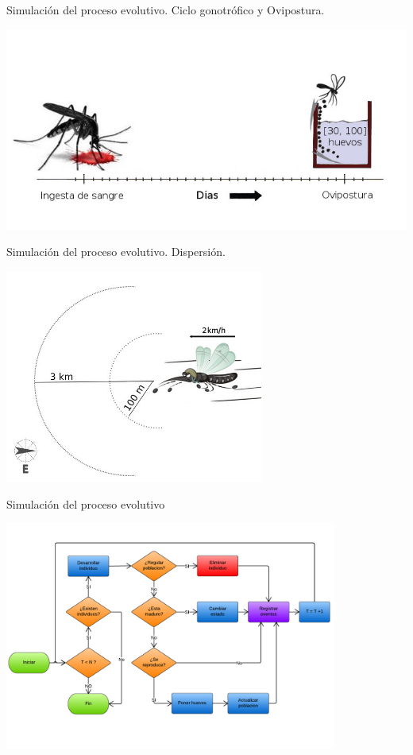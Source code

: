 \begin{frame}[c]{Simulación del proceso evolutivo. Ciclo gonotrófico y Ovipostura.}
  \begin{center}
      \includegraphics[width=\textwidth]{./graphics/cliclo-gonotrofico-tiempo.jpg}
  \end{center}
\end{frame}

\begin{frame}[c]{Simulación del proceso evolutivo. Dispersión.}
  \begin{center}
    \includegraphics[width=8.5cm]{./graphics/dispersion.jpg}
  \end{center}
\end{frame}


\begin{frame}[c]{Simulación del proceso evolutivo}
  \begin{center}
    \includegraphics[height=7.5cm]{./graphics/algoritmo-propuesto.png}
  \end{center}
\end{frame}

